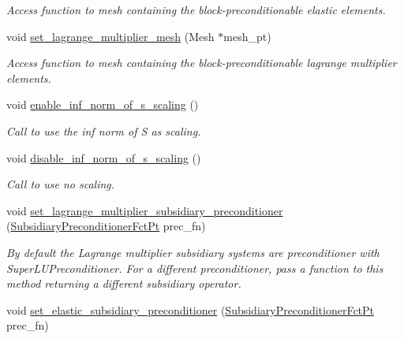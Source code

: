 \begin{DoxyCompactItemize}
\begin{DoxyCompactList}\small\item\em Access function to mesh containing the block-\/preconditionable elastic elements. \end{DoxyCompactList}\item 
void \hyperlink{classoomph_1_1PseudoElasticPreconditionerOld_a432b5e0501644ae3fa6a9dadd8f52c60}{set\+\_\+lagrange\+\_\+multiplier\+\_\+mesh} (Mesh $\ast$mesh\+\_\+pt)
\begin{DoxyCompactList}\small\item\em Access function to mesh containing the block-\/preconditionable lagrange multiplier elements. \end{DoxyCompactList}\item 
void \hyperlink{classoomph_1_1PseudoElasticPreconditionerOld_a5175c5ba92a63e7e47ca87883753b28c}{enable\+\_\+inf\+\_\+norm\+\_\+of\+\_\+s\+\_\+scaling} ()
\begin{DoxyCompactList}\small\item\em Call to use the inf norm of S as scaling. \end{DoxyCompactList}\item 
void \hyperlink{classoomph_1_1PseudoElasticPreconditionerOld_a5b23f319564110f34c07fbaacd40e446}{disable\+\_\+inf\+\_\+norm\+\_\+of\+\_\+s\+\_\+scaling} ()
\begin{DoxyCompactList}\small\item\em Call to use no scaling. \end{DoxyCompactList}\item 
void \hyperlink{classoomph_1_1PseudoElasticPreconditionerOld_ab0f5cd103d172fcb33be52c17bb741d3}{set\+\_\+lagrange\+\_\+multiplier\+\_\+subsidiary\+\_\+preconditioner} (\hyperlink{classoomph_1_1PseudoElasticPreconditionerOld_a8ee80a4a55139190a6e2a16fa175e75f}{Subsidiary\+Preconditioner\+Fct\+Pt} prec\+\_\+fn)
\begin{DoxyCompactList}\small\item\em By default the Lagrange multiplier subsidiary systems are preconditioner with Super\+L\+U\+Preconditioner. For a different preconditioner, pass a function to this method returning a different subsidiary operator. \end{DoxyCompactList}\item 
void \hyperlink{classoomph_1_1PseudoElasticPreconditionerOld_aae1c5f984fee69fca7cd9719ed2222a4}{set\+\_\+elastic\+\_\+subsidiary\+\_\+preconditioner} (\hyperlink{classoomph_1_1PseudoElasticPreconditionerOld_a8ee80a4a55139190a6e2a16fa175e75f}{Subsidiary\+Preconditioner\+Fct\+Pt} prec\+\_\+fn)

\end{DoxyCompactItemize}
